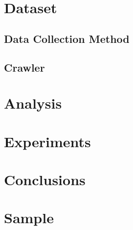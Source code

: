 \documentclass[11pt]{article}
\begin{document}
\section{Dataset}\label{section-dataset}
\subsection{Data Collection Method}
\subsection{Crawler}

\section{Analysis}\label{section-analysis}

\section{Experiments}\label{section-experiments}

\section{Conclusions}\label{section-conclusions}

\section{Sample}\label{section-sample}



\end{document}
